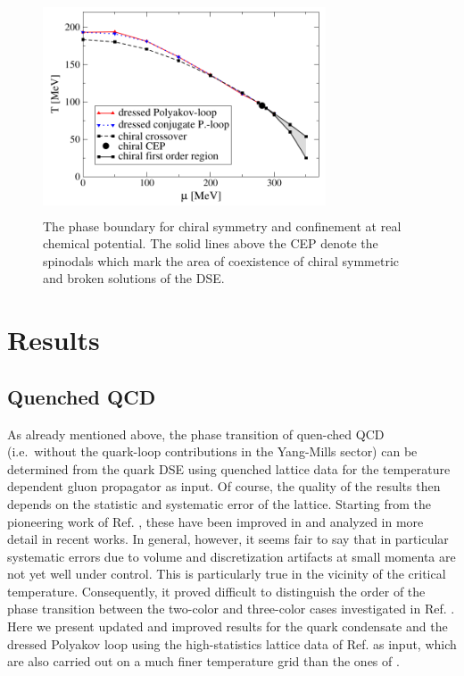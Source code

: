 \documentclass[a4paper,fleqn]{cls/cas-dc}
\begin{document}
	\begin{figure}
		\centering
		\includegraphics[width=3.3in,height=2.5in]{fig/fig5.png}
		\caption{The phase boundary for chiral symmetry and confinement at real chemical potential. The solid lines above the CEP denote the spinodals which
			mark the area of coexistence of chiral symmetric and broken solutions of the DSE.}
		\label{FIG:5}
	\end{figure}	
\section{Results}
\subsection{Quenched QCD}
As already mentioned above, the phase transition of quen-ched QCD (i.e.\ without the quark-loop contributions in the
Yang-Mills sector) can be determined from the quark DSE using quenched lattice data for the temperature dependent
gluon propagator as input. Of course, the quality of the results then depends on the statistic and systematic error of the
lattice. Starting from the pioneering work of Ref. \cite{PhysRevD.75.076003}, these have been improved in \cite{Fischer2010} and analyzed in more detail in recent
works. In general, however, it seems fair to say that in particular systematic errors due to volume and discretization
artifacts at small momenta are not yet well under control. This is particularly true in the vicinity of the critical temperature.
Consequently, it proved difficult to distinguish the order of the phase transition between the two-color and three-color cases
investigated in Ref. \cite{Fischer2010}. Here we present updated and improved results for the quark condensate and the dressed Polyakov
loop using the high-statistics lattice data of Ref. as input, which are also carried out on a much finer temperature grid
than the ones of \cite{Fischer2010}.
\end{document}
